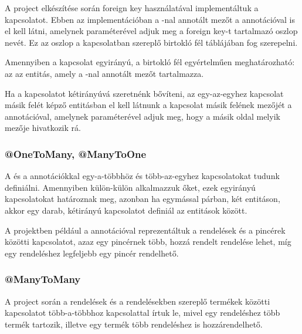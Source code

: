A project elkészítése során foreign key használatával implementáltuk a kapcsolatot. Ebben az implementációban a -nal annotált mezőt a  annotációval is el kell látni, amelynek  paraméterével adjuk meg a foreign key-t tartalmazó oszlop nevét. Ez az oszlop a kapcsolatban szereplő birtokló fél táblájában fog szerepelni. \par

Amennyiben a kapcsolat egyirányú, a birtokló fél egyértelműen meghatározható: az az entitás, amely a -nal annotált mezőt tartalmazza.\par

Ha a kapcsolatot kétirányúvá szeretnénk bővíteni, az egy-az-egyhez kapcsolat másik felét képző entitásban el kell látnunk a kapcsolat másik felének mezőjét a  annotációval, amelynek  paraméterével adjuk meg, hogy a másik oldal melyik mezője hivatkozik rá. \par


\subsubsection{@OneToMany, @ManyToOne}
A  és a  annotációkkal egy-a-többhöz és több-az-egyhez kapcsolatokat tudunk definiálni. Amennyiben külön-külön alkalmazzuk őket, ezek egyirányú kapcsolatokat határoznak meg, azonban ha egymással párban, két entitáson, akkor egy darab, kétirányú kapcsolatot definiál az entitások között. \par

A projektben például a  annotációval reprezentáltuk a rendelések és a pincérek közötti kapcsolatot, azaz egy pincérnek több, hozzá rendelt rendelése lehet, míg egy rendeléshez legfeljebb egy pincér rendelhető.


\subsubsection{@ManyToMany}

A project során a rendelések és a rendelésekben szereplő termékek közötti kapcsolatot több-a-többhoz kapcsolattal írtuk le, mivel egy rendeléshez több termék tartozik, illetve egy termék több rendeléshez is hozzárendelhető. \par

